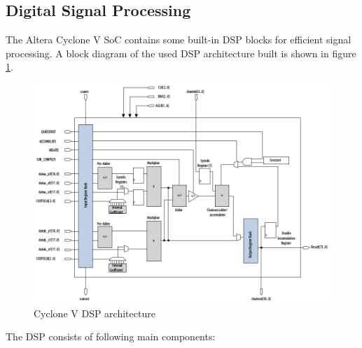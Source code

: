 \subsection{Digital Signal Processing}
The Altera Cyclone V SoC contains some built-in DSP blocks for efficient signal processing. A block diagram of the used DSP architecture built is shown in figure \ref{fig:fpgadsp}.
\begin{figure}[htbp]
\begin{center}
\includegraphics[width=15cm,keepaspectratio=true]{bilder/png/fpgadsp}
\caption{Cyclone V DSP architecture\cite[chapter 3]{AlteraFPGA15}}
\label{fig:fpgadsp}
\end{center}
\end{figure}
The DSP consists of following main components:
